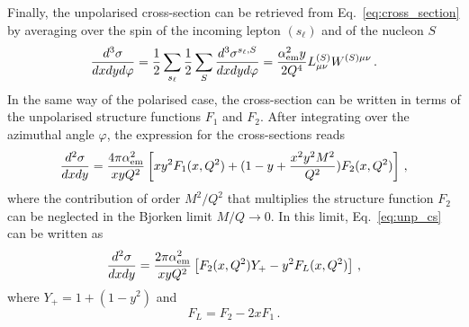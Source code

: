 Finally, the unpolarised cross-section can be retrieved from Eq.~\eqref{eq:cross_section} by averaging over the spin of the incoming lepton $(s_{\ell})$ and of the nucleon $S$
\begin{equation}
  \frac{d^3 \sigma}{dx dy d\varphi} = \frac{1}{2} \sum_{s_{\ell}} \frac{1}{2} \sum_{S} \frac{d^3 \sigma^{s_{\ell},S}}{dx dy d\varphi} = \frac{\alpha_{\textrm{em}}^2 y}{2 Q^4} L_{\mu \nu}^{(S)}W^{(S)\mu \nu}\,.
\end{equation}
In the same way of the polarised case, the cross-section can be written in terms of the unpolarised structure functions $F_1$ and $F_2$. After integrating over the azimuthal angle $\varphi$, the expression for the cross-sections reads
\begin{equation}
  \frac{d^2 \sigma}{dx dy} = \frac{4 \pi \alpha_{\textrm{em}}^2}{xyQ^2} \left[ xy^2 F_1(x,Q^2) + (1-y + \frac{x^2y^2 M^2}{Q^2})F_{2}(x,Q^2)\right] \,,
  \label{eq:unp_cs}
\end{equation}
where the contribution of order $M^2/Q^2$ that multiplies the structure function $F_2$ can be neglected in the Bjorken limit $M/Q \rightarrow 0$. In this limit, Eq.~\eqref{eq:unp_cs} can be written as\\
\begin{equation}
  \frac{d^2 \sigma}{dx dy} = \frac{2 \pi \alpha_{\textrm{em}}^2}{xyQ^2} \left[ F_2(x,Q^2) Y_{+} - y^2 F_{L}(x,Q^2) \right]\,,
\end{equation} 
where $Y_{+} = 1 + (1-y^2)$ and 
\begin{equation}
  F_{L} = F_2 - 2xF_1 \,.
  \label{eq:Callan_Gross}
\end{equation}


